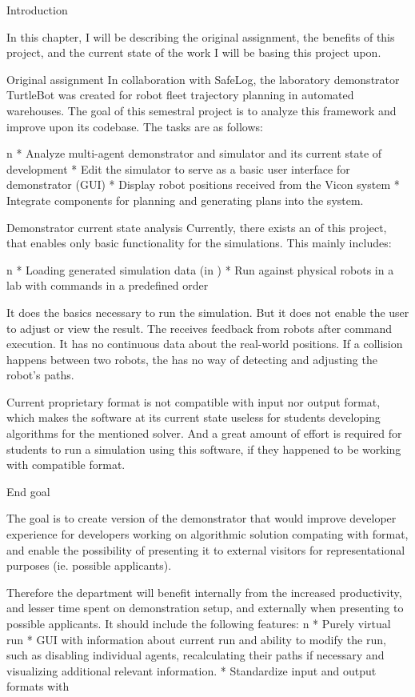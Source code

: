 \chap Introduction

In this chapter, I will be describing the original assignment, the benefits of this project, and the current state of the work I will be basing this project upon.

\sec Original assignment
In collaboration with SafeLog, the laboratory demonstrator TurtleBot was created for robot fleet trajectory planning in automated warehouses. The goal of this semestral project is to analyze this framework and improve upon its codebase. The tasks are as follows:

\begitems \style n
    * Analyze multi-agent demonstrator and simulator {\mapfIR} and its current state of development 
    * Edit the simulator to serve as a basic user interface for demonstrator (GUI)
    * Display robot positions received from the Vicon system
    * Integrate components for planning and generating plans into the system.
\enditems

\sec Demonstrator current state analysis
Currently, there exists an {\oldRepo} of this project, that enables only basic functionality for the simulations. This mainly includes:

\begitems \style n
    * Loading generated simulation data (in {\oldFormat})
    * Run against physical robots in a lab with commands in a predefined order
\enditems

It does the basics necessary to run the simulation. But it does not enable the user to adjust or view the result. The {\oldRepo} receives feedback from robots after command execution. It has no continuous data about the real-world positions. If a collision happens between two robots, the {\oldRepo} has no way of detecting and adjusting the robot's paths.

Current proprietary format is not compatible with {\mapfIR} input nor output format, which makes the software at its current state useless for students developing algorithms for the mentioned solver. And a great amount of effort is required for students to run a simulation using this software, if they happened to be working with compatible format.

\sec End goal

The goal is to create version of the demonstrator that would improve developer experience for developers working on algorithmic solution compating with {\mapfIR} format, and enable the possibility of presenting it to external visitors for representational purposes (ie. possible applicants).

Therefore the department will benefit internally from the increased productivity, and lesser time spent on demonstration setup, and externally when presenting to possible applicants.
It should include the following features:
\begitems \style n
    * Purely virtual run
    * GUI with information about current run and ability to modify the run, such as disabling individual agents, recalculating their paths if necessary and visualizing additional relevant information.
    * Standardize input and output formats with \mapfIR
\enditems